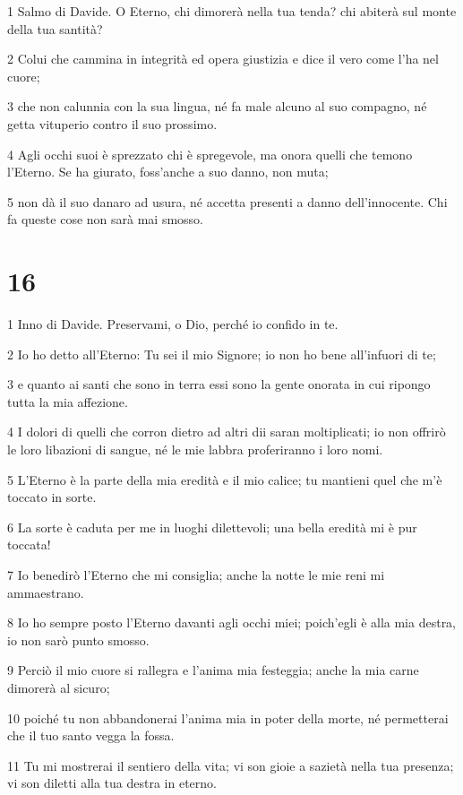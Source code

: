 \par 1 Salmo di Davide. O Eterno, chi dimorerà nella tua tenda? chi abiterà sul monte della tua santità?
\par 2 Colui che cammina in integrità ed opera giustizia e dice il vero come l'ha nel cuore;
\par 3 che non calunnia con la sua lingua, né fa male alcuno al suo compagno, né getta vituperio contro il suo prossimo.
\par 4 Agli occhi suoi è sprezzato chi è spregevole, ma onora quelli che temono l'Eterno. Se ha giurato, foss'anche a suo danno, non muta;
\par 5 non dà il suo danaro ad usura, né accetta presenti a danno dell'innocente. Chi fa queste cose non sarà mai smosso.

\chapter{16}

\par 1 Inno di Davide. Preservami, o Dio, perché io confido in te.
\par 2 Io ho detto all'Eterno: Tu sei il mio Signore; io non ho bene all'infuori di te;
\par 3 e quanto ai santi che sono in terra essi sono la gente onorata in cui ripongo tutta la mia affezione.
\par 4 I dolori di quelli che corron dietro ad altri dii saran moltiplicati; io non offrirò le loro libazioni di sangue, né le mie labbra proferiranno i loro nomi.
\par 5 L'Eterno è la parte della mia eredità e il mio calice; tu mantieni quel che m'è toccato in sorte.
\par 6 La sorte è caduta per me in luoghi dilettevoli; una bella eredità mi è pur toccata!
\par 7 Io benedirò l'Eterno che mi consiglia; anche la notte le mie reni mi ammaestrano.
\par 8 Io ho sempre posto l'Eterno davanti agli occhi miei; poich'egli è alla mia destra, io non sarò punto smosso.
\par 9 Perciò il mio cuore si rallegra e l'anima mia festeggia; anche la mia carne dimorerà al sicuro;
\par 10 poiché tu non abbandonerai l'anima mia in poter della morte, né permetterai che il tuo santo vegga la fossa.
\par 11 Tu mi mostrerai il sentiero della vita; vi son gioie a sazietà nella tua presenza; vi son diletti alla tua destra in eterno.

